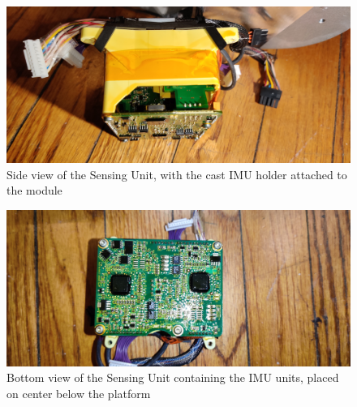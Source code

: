 \documentclass[]{formalLabReport}
\begin{document}
\begin{figure}
    \includegraphics[]{segwayGyroCubeSide.jpg}
    \caption{Side view of the Sensing Unit, with the cast IMU holder attached to the module}
    \label{fig:segwayGyroCubeSide.jpg}
\end{figure}

\begin{figure}
    \includegraphics[]{segwayGyroCubeBottom.jpg}
    \caption{Bottom view of the Sensing Unit containing the IMU units, placed on center below the platform}
    \label{fig:segwayGyroCubeBottom.jpg}
\end{figure}
\end{document}
